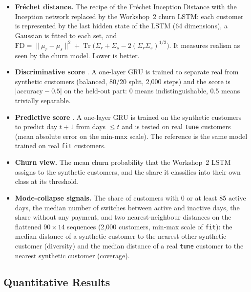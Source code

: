\documentclass{article}
\begin{document}
\begin{itemize}
    \item \textbf{Fréchet distance.} The recipe of the Fréchet Inception Distance \cite{heusel2017} with the Inception network replaced by the Workshop~2 churn LSTM: each customer is represented by the last hidden state of the LSTM (64 dimensions), a Gaussian is fitted to each set, and $\text{FD} = \|\mu_r - \mu_s\|^2 + \operatorname{Tr}\big(\Sigma_r + \Sigma_s - 2(\Sigma_r \Sigma_s)^{1/2}\big)$. It measures realism as seen by the churn model. Lower is better.
    \item \textbf{Discriminative score} \cite{yoon2019}. A one-layer GRU is trained to separate real from synthetic customers (balanced, 80/20 split, 2{,}000 steps) and the score is $|\text{accuracy} - 0.5|$ on the held-out part: 0 means indistinguishable, 0.5 means trivially separable.
    \item \textbf{Predictive score} \cite{yoon2019}. A one-layer GRU is trained on the synthetic customers to predict day $t+1$ from days $\le t$ and is tested on real \texttt{tune} customers (mean absolute error on the min-max scale). The reference is the same model trained on real \texttt{fit} customers.
    \item \textbf{Churn view.} The mean churn probability that the Workshop~2 LSTM assigns to the synthetic customers, and the share it classifies into their own class at its threshold.
    \item \textbf{Mode-collapse signals.} The share of customers with 0 or at least 85 active days, the median number of switches between active and inactive days, the share without any payment, and two nearest-neighbour distances on the flattened $90 \times 14$ sequences (2{,}000 customers, min-max scale of \texttt{fit}): the median distance of a synthetic customer to the nearest other synthetic customer (diversity) and the median distance of a real \texttt{tune} customer to the nearest synthetic customer (coverage).
\end{itemize}

\subsection{Quantitative Results}
\end{document}
